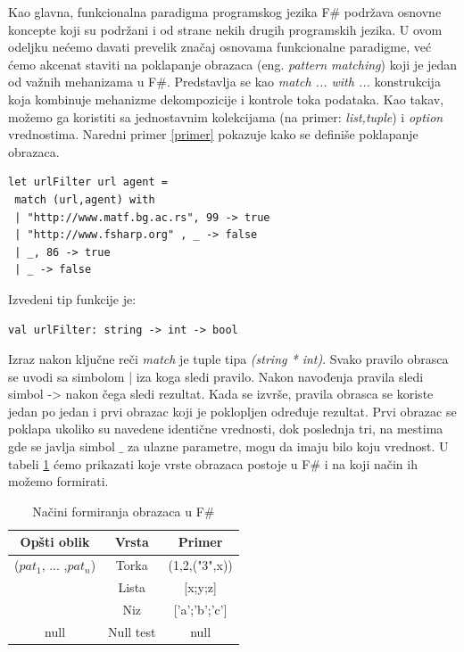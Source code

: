 \documentclass[a4paper]{article}
\begin{document}
Kao glavna, funkcionalna paradigma programskog jezika F\# podržava osnovne koncepte koji su podržani i od strane nekih drugih programskih jezika. U ovom odeljku nećemo davati prevelik značaj osnovama funkcionalne paradigme, već ćemo akcenat staviti na poklapanje obrazaca (eng. {\em pattern matching}) \cite{expertFS} koji je jedan od važnih mehanizama u F\#.
Predstavlja se kao {\em match ... with ...} konstrukcija koja kombinuje mehanizme dekompozicije i kontrole toka podataka. Kao takav, možemo ga koristiti sa  jednostavnim kolekcijama (na primer: {\em list,tuple}) i {\em option} vrednostima. Naredni primer \ref{primer} pokazuje kako se definiše poklapanje obrazaca.
\\
\begin{lstlisting}[caption={Primer poklapanja obrazaca \cite{expertFS}},frame=single, label=primer]
let urlFilter url agent =
 match (url,agent) with
 | "http://www.matf.bg.ac.rs", 99 -> true
 | "http://www.fsharp.org" , _ -> false
 | _, 86 -> true
 | _ -> false
\end{lstlisting} 

Izvedeni tip funkcije je: \\

\begin{lstlisting}
val urlFilter: string -> int -> bool
\end{lstlisting}

Izraz nakon ključne reči {\em match} je tuple tipa {\em (string * int)}. Svako pravilo obrasca se uvodi sa simbolom | iza koga sledi pravilo. Nakon navođenja pravila sledi simbol -> nakon čega sledi rezultat. Kada se izvrše, pravila obrasca se koriste jedan po jedan i prvi obrazac koji je poklopljen određuje rezultat. Prvi obrazac se poklapa ukoliko su navedene identične vrednosti, dok poslednja tri, na mestima gde se javlja simbol $\_$ za ulazne parametre, mogu da imaju bilo koju vrednost. U tabeli \ref{tab:tabela1} ćemo prikazati koje vrste obrazaca postoje u F\# i na koji način ih možemo formirati.
 
\begin{table}[h!]
\begin{center}
\caption{Načini formiranja obrazaca u F\#}
\begin{tabular}{|c|c|c|} \hline
\textbf{Opšti oblik}& \textbf{Vrsta}& \textbf{Primer}\\ \hline
($pat_{1}$, ... ,$pat_{n}$) &Torka&(1,2,("3",x))
\\ \hline
[$pat_{1}$, ... ,$pat_{n}$] &Lista&[x;y;z]\\ \hline
[|$pat_{1}$, ... ,$pat_{n}$|] &Niz&['a';'b';'c']\\ \hline
null &Null test &null\\ \hline
\end{tabular}
\label{tab:tabela1}
\end{center}
\end{table}
\end{document}
